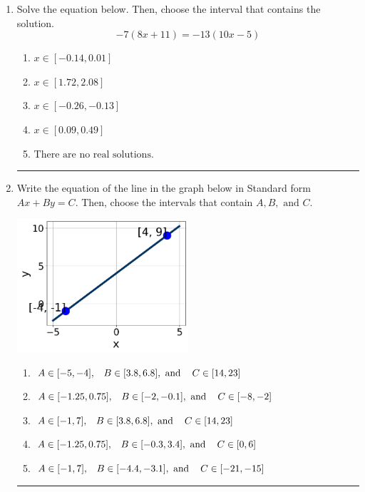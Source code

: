 \documentclass[14pt]{extbook}
\newcommand{\litem}[1]{\item#1\hspace*{-1cm}\rule{\textwidth}{0.4pt}}
\begin{document}
\begin{enumerate}
{\begin{enumerate}[label=\Alph*.]
\end{enumerate} }
\litem{
Solve the equation below. Then, choose the interval that contains the solution.\[ -7(8x + 11) = -13(10x -5) \]\begin{enumerate}[label=\Alph*.]
\item \( x \in [-0.14, 0.01] \)
\item \( x \in [1.72, 2.08] \)
\item \( x \in [-0.26, -0.13] \)
\item \( x \in [0.09, 0.49] \)
\item \( \text{There are no real solutions.} \)

\end{enumerate} }
\litem{
Write the equation of the line in the graph below in Standard form $Ax+By=C$. Then, choose the intervals that contain $A, B, \text{ and } C$.
\begin{center}
    \includegraphics[width=0.5\textwidth]{../Figures/linearGraphToStandardCopyC.png}
\end{center}
\begin{enumerate}[label=\Alph*.]
\item \( A \in [-5, -4], \hspace{3mm} B \in [3.8, 6.8], \text{ and } \hspace{3mm} C \in [14, 23] \)
\item \( A \in [-1.25, 0.75], \hspace{3mm} B \in [-2, -0.1], \text{ and } \hspace{3mm} C \in [-8, -2] \)
\item \( A \in [-1, 7], \hspace{3mm} B \in [3.8, 6.8], \text{ and } \hspace{3mm} C \in [14, 23] \)
\item \( A \in [-1.25, 0.75], \hspace{3mm} B \in [-0.3, 3.4], \text{ and } \hspace{3mm} C \in [0, 6] \)
\item \( A \in [-1, 7], \hspace{3mm} B \in [-4.4, -3.1], \text{ and } \hspace{3mm} C \in [-21, -15] \)


\end{enumerate}}
\end{enumerate}
\end{document}

